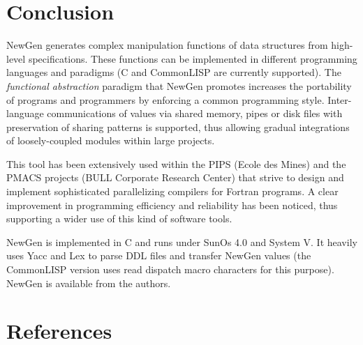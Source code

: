 \section{Conclusion}

NewGen generates complex manipulation functions of data structures from
high-level specifications. These functions can be implemented in
different programming languages and paradigms (C and CommonLISP are
currently supported). The {\em functional abstraction} paradigm that
NewGen promotes increases the portability of programs and programmers by
enforcing a common programming style. Inter-language communications of
values via shared memory, pipes or disk files with preservation of
sharing patterns is supported, thus allowing gradual integrations of
loosely-coupled modules within large projects.

This tool has been extensively used within the PIPS (Ecole des Mines)
and the PMACS projects (BULL Corporate Research Center) that strive to
design and implement sophisticated parallelizing compilers for Fortran
programs. A clear improvement in programming efficiency and reliability
has been noticed, thus supporting a wider use of this kind of software
tools.

NewGen is implemented in C and runs under SunOs 4.0 and System V. It
heavily uses Yacc and Lex to parse DDL files and transfer NewGen values
(the CommonLISP version uses read dispatch macro characters for this
purpose). NewGen is available from the authors.

\section*{References}

